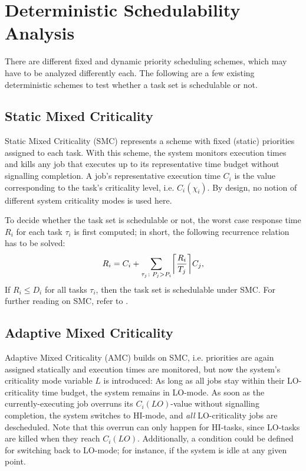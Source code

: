 \documentclass[a4paper,oneside]{csthesis}
\DeclarePairedDelimiter{\ceil}{\lceil}{\rceil}
\begin{document}
\section{Deterministic Schedulability Analysis}
\label{sec:sys-model-det-ana}
There are different fixed and dynamic priority scheduling schemes, which may have to be analyzed differently each. The following are a few existing deterministic schemes to test whether a task set is schedulable or not.

\subsection{Static Mixed Criticality}
\label{subsec:dsmc}
Static Mixed Criticality (SMC) represents a scheme with fixed (static) priorities assigned to each task. With this scheme, the system monitors execution times and kills any job that executes up to its representative time budget without signalling completion. A job's representative execution time $C_i$ is the value corresponding to the task's criticality level, i.e. $C_i(\chi_i)$. By design, no notion of different system criticality modes is used here. 

To decide whether the task set is schedulable or not, the worst case response time $R_i$ for each task $\tau_i$ is first computed; in short, the following recurrence relation has to be solved:
\begin{equation*}
    R_i = C_i + \sum_{\tau_j \colon P_j > P_i} \ceil[\bigg]{\frac{R_i}{T_j}} C_j,
\end{equation*}
If $R_i \leq D_i$ for all tasks $\tau_i$, then the task set is schedulable under SMC. For further reading on SMC, refer to \cite{baruah2011response}.

\subsection{Adaptive Mixed Criticality}
\label{subsec:damc}
Adaptive Mixed Criticality (AMC) builds on SMC, i.e. priorities are again assigned statically and execution times are monitored, but now the system's criticality mode variable $L$ is introduced: As long as all jobs stay within their LO-criticality time budget, the system remains in LO-mode. As soon as the currently-executing job overruns its $C_i(LO)$-value without signalling completion, the system switches to HI-mode, and \textit{all} LO-criticality jobs are descheduled. Note that this overrun can only happen for HI-tasks, since LO-tasks are killed when they reach $C_i(LO)$. Additionally, a condition could be defined for switching back to LO-mode; for instance, if the system is idle at any given point.
\end{document}
